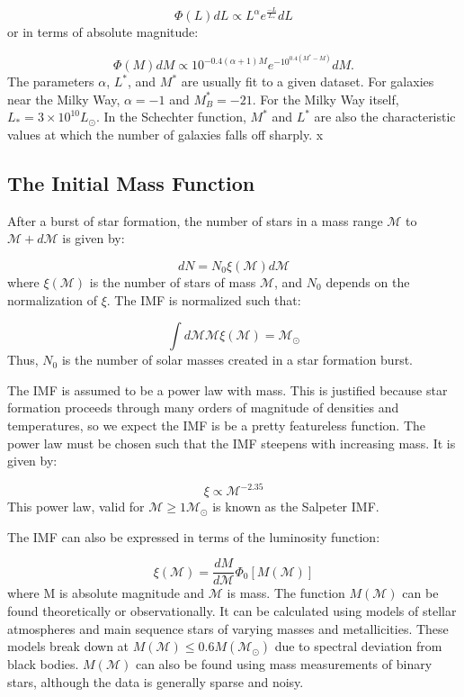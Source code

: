 \begin{equation}
\Phi(L) dL \propto L^\alpha  e^{\frac{-L}{L_*}} dL
\end{equation}
or in terms of absolute magnitude:

\begin{equation}
\Phi(M) dM \propto 10^{-0.4(\alpha+1)M} e^{-10^{0.4(M^*-M)}} dM.
 \end{equation}
 The parameters $\alpha$, $L^*$, and $M^*$ are usually fit to a given dataset. For galaxies near the Milky Way, $\alpha = -1$ and $M^*_B = -21$. For the Milky Way itself, $L_* = 3\times 10^{10} L_\odot$. In the Schechter function, $M^*$ and $L^*$ are also the characteristic values at which the number of galaxies falls off sharply. x 

\subsection{The Initial Mass Function}

After a burst of star formation, the number of stars in a mass range $\mathcal{M}$ to $\mathcal{M}+d\mathcal{M}$ is given by:

\begin{equation}
dN = N_0 \xi(\mathcal{M}) d\mathcal{M}
\end{equation}
where $\xi(\mathcal{M})$ is the number of stars of mass $\mathcal{M}$, and $N_0$ depends on the normalization of $\xi$. The IMF is normalized such that:

\begin{equation}
\int d\mathcal{M} \mathcal{M} \xi(\mathcal{M}) = \mathcal{M}_\odot
\end{equation}
Thus, $N_0$ is the number of solar masses created in a star formation burst. 

The IMF is assumed to be a power law with mass. This is justified because star formation proceeds through many orders of magnitude of densities and temperatures, so we expect the IMF is be a pretty featureless function. The power law must be chosen such that the IMF steepens with increasing mass. It is given by:

\begin{equation}
\xi  \propto \mathcal{M}^{-2.35}
\end{equation}
This power law, valid for $\mathcal{M} \geq 1\mathcal{M}_\odot$ is known as the Salpeter IMF.

The IMF can also be expressed in terms of the luminosity function:

\begin{equation}
\xi(\mathcal{M}) = \frac{dM}{d\mathcal{M}} \Phi_0 [M(\mathcal{M})]
\end{equation}
where M is absolute magnitude and $\mathcal{M}$ is mass. The function $M(\mathcal{M})$ can be found theoretically or observationally. It can be calculated using models of stellar atmospheres and main sequence stars of varying masses and metallicities. These models break down at $M(\mathcal{M}) \leq 0.6 M(\mathcal{M}_\odot)$ due to spectral deviation from black bodies. $M(\mathcal{M})$ can also be found using mass measurements of binary stars, although the data is generally sparse and noisy. 

